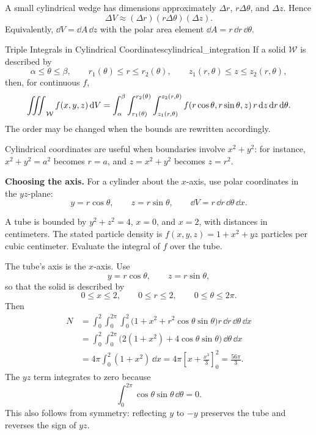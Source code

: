 A small cylindrical wedge has dimensions approximately $\Delta r$, $r\Delta\theta$, and $\Delta z$. Hence
\[
    \Delta V \approx (\Delta r)(r\Delta\theta)(\Delta z).
\]
Equivalently, $\dd{V} = \dd{A}\,\dd{z}$ with the polar area element $\dd{A} = r\,\dd{r}\,\dd{\theta}$.

\begin{theorem}{Triple Integrals in Cylindrical Coordinates}{cylindrical_integration}
If a solid $\mathcal{W}$ is described by
\[
    \alpha \leq \theta \leq \beta,\qquad
    r_1(\theta) \leq r \leq r_2(\theta),\qquad
    z_1(r,\theta) \leq z \leq z_2(r,\theta),
\]
then, for continuous $f$,
\[
    \mathop{\int\mkern-10mu\int\mkern-10mu\int}\nolimits_{\mathcal{W}} f(x,y,z) \, \mathrm{d}V
    = \int_\alpha^\beta\int_{r_1(\theta)}^{r_2(\theta)}
    \int_{z_1(r,\theta)}^{z_2(r,\theta)}
    f(r\cos\theta,r\sin\theta,z)\,r\,\mathrm{d}z\,\mathrm{d}r\,\mathrm{d}\theta.
\]
The order may be changed when the bounds are rewritten accordingly.
\end{theorem}

Cylindrical coordinates are useful when boundaries involve $x^2 + y^2$: for instance, $x^2 + y^2 = a^2$ becomes $r = a$, and $z = x^2 + y^2$ becomes $z = r^2$.

\textbf{Choosing the axis.} For a cylinder about the $x$-axis, use polar coordinates in the $yz$-plane:
\[
    y = r\cos\theta,\qquad z = r\sin\theta,\qquad
    \dd{V} = r\,\dd{r}\,\dd{\theta}\,\dd{x}.
\]

\clearpage
\begin{example}
A tube is bounded by $y^2 + z^2 = 4$, $x = 0$, and $x = 2$, with distances in centimeters. The stated particle density is $f(x,y,z) = 1 + x^2 + yz$ particles per cubic centimeter. Evaluate the integral of $f$ over the tube.
\end{example}

\begin{sol}
The tube's axis is the $x$-axis. Use
\[
    y = r\cos\theta,\qquad z = r\sin\theta,
\]
so that the solid is described by
\[
    0 \leq x \leq 2,\qquad 0 \leq r \leq 2,\qquad
    0 \leq \theta \leq 2\pi.
\]
Then
\begin{align*}
    N &= \int_0^2\int_0^{2\pi}\int_0^2
    \bigl(1 + x^2 + r^2\cos\theta\sin\theta\bigr)
    r\,\dd{r}\,\dd{\theta}\,\dd{x}\\
    &= \int_0^2\int_0^{2\pi}
    \bigl(2(1 + x^2) + 4\cos\theta\sin\theta\bigr)
    \,\dd{\theta}\,\dd{x}\\
    &= 4\pi\int_0^2(1 + x^2)\,\dd{x}
    = 4\pi\left[x + \frac{x^3}{3}\right]_0^2
    = \boxed{\frac{56\pi}{3}}.
\end{align*}
The $yz$ term integrates to zero because
\[
    \int_0^{2\pi}\cos\theta\sin\theta\,\dd{\theta} = 0.
\]
This also follows from symmetry: reflecting $y$ to $-y$ preserves the tube and reverses the sign of $yz$.
\end{sol}

